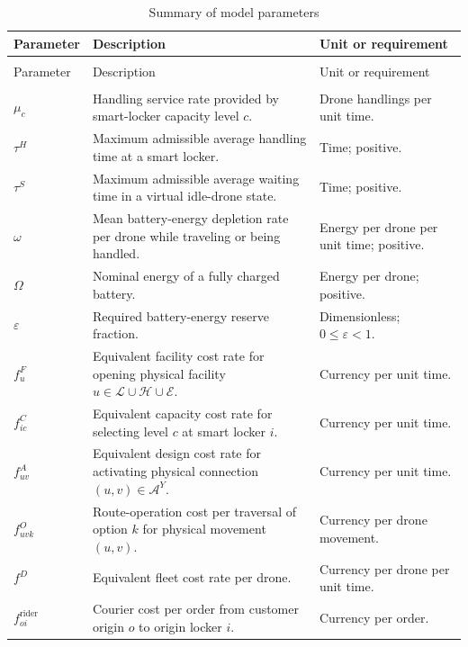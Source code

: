 \documentclass[final,3p,authoryear]{elsarticle}
\begin{document}
\begingroup
\small
\renewcommand{\arraystretch}{1.05}
\begin{longtable}{@{}>{\raggedright\arraybackslash}p{}>{\raggedright\arraybackslash}p{}>{\raggedright\arraybackslash}p{}@{}}
\caption{Summary of model parameters}
\label{tab:model_parameters}\\
\toprule
Parameter & Description & Unit or requirement \\
\midrule
\endfirsthead
\multicolumn{3}{c}{Table~\thetable\ continued}\\
\toprule
Parameter & Description & Unit or requirement \\
\midrule
\endhead
\midrule
\multicolumn{3}{r}{Continued on next page}\\
\endfoot
\bottomrule
\endlastfoot
$\mu_c$ & Handling service rate provided by smart-locker capacity level $c$. & Drone handlings per unit time. \\
$\tau^H$ & Maximum admissible average handling time at a smart locker. & Time; positive. \\
$\tau^S$ & Maximum admissible average waiting time in a virtual idle-drone state. & Time; positive. \\
$\omega$ & Mean battery-energy depletion rate per drone while traveling or being handled. & Energy per drone per unit time; positive. \\
$\Omega$ & Nominal energy of a fully charged battery. & Energy per drone; positive. \\
$\varepsilon$ & Required battery-energy reserve fraction. & Dimensionless; $0\le\varepsilon<1$. \\
$f_u^{F}$ & Equivalent facility cost rate for opening physical facility $u\in\mathcal L\cup\mathcal H\cup\mathcal E$. & Currency per unit time. \\
$f_{ic}^{C}$ & Equivalent capacity cost rate for selecting level $c$ at smart locker $i$. & Currency per unit time. \\
$f_{uv}^{A}$ & Equivalent design cost rate for activating physical connection $(u,v)\in\mathcal A^Y$. & Currency per unit time. \\
$f_{uvk}^{O}$ & Route-operation cost per traversal of option $k$ for physical movement $(u,v)$. & Currency per drone movement. \\
$f^{D}$ & Equivalent fleet cost rate per drone. & Currency per drone per unit time. \\
$f_{oi}^{\mathrm{rider}}$ & Courier cost per order from customer origin $o$ to origin locker $i$. & Currency per order. \\
\end{longtable}
\endgroup
\end{document}

